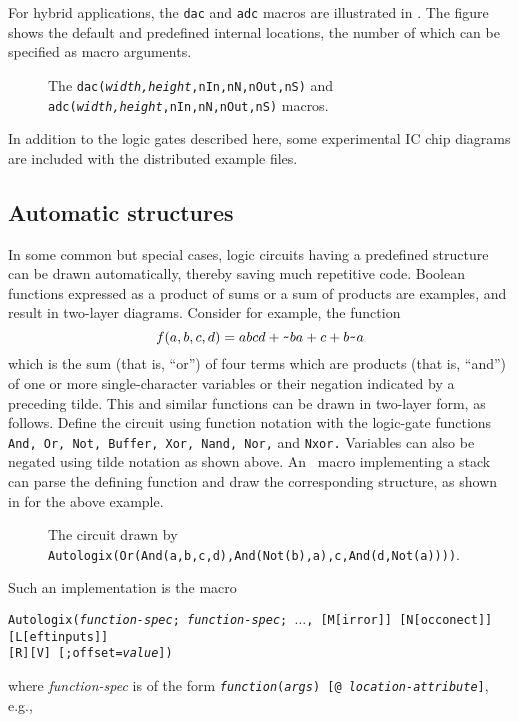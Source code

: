For hybrid applications, the \verb|dac| and \verb|adc| macros are
illustrated in .
The figure shows the default and predefined internal locations, the number
of which can be specified as macro arguments.
\begin{figure}[H]
   
   \caption{The {\tt dac({\sl width,height},nIn,nN,nOut,nS)}
   and {\tt adc({\sl width,height},nIn,nN,nOut,nS)} macros.}
   \label{Dac}
   \end{figure}

In addition to the logic gates described here, some experimental
IC chip diagrams are included with the distributed example files.

\subsection{Automatic structures\label{Automatic:}}
In some common but special cases, logic circuits having a predefined
structure can be drawn automatically, thereby saving much
repetitive code.  Boolean functions
expressed as a product of sums or a sum of products are examples, and
result in two-layer diagrams.  Consider for example, the function
\[
  f(a,b,c,d) = abcd + \hbox{\tt\char126}ba + c + b\hbox{\tt\char126}a
  \]
which is the sum (that is, ``or'') of four terms which are products
(that is, ``and'') of one or more single-character variables or their
negation indicated by a preceding tilde.  This and similar functions can
be drawn in two-layer form, as follows.  Define the circuit using function
notation with the logic-gate functions {\tt And, Or, Not, Buffer, Xor,
Nand, Nor,} and {\tt Nxor.} Variables can also be negated using tilde
notation as shown above.  An \Mfour\ macro implementing a stack can
parse the defining function and draw the corresponding structure,
as shown in  for the above example.
\begin{figure}[H]
   \vspace*{-\baselineskip}
   
   \caption{The circuit drawn by
     {\tt Autologix(Or(And(a,b,c,d),And(Not(b),a),c,And(d,Not(a))))}.}
   \label{Autologix}
   \end{figure}
Such an implementation is the macro

{\tt Autologix({\sl function-spec}; {\sl function-spec}; $\ldots$,
 [M[irror]] [N[occonect]] [L[eftinputs]]\\
 {}\hspace*{20bp} [R][V] [;offset={\sl value}])} 

\noindent
where {\sl function-spec} is of the form
{\tt{\sl function}({\sl args}) [@ {\sl location-attribute}]},
e.g.,

